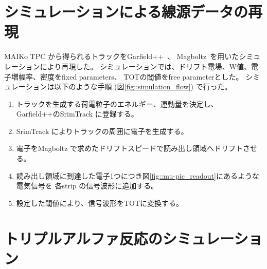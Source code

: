 \documentclass[../master]{subfiles}
\begin{document}
\section{シミュレーションによる線源データの再現}
MAIKo TPC から得られるトラックをGarfield++~\cite{garfield++}、
Magboltz~\cite{magboltz}を用いたシミュレーションにより再現した。
シミュレーションでは、ドリフト電場、W値、電子増幅率、密度をfixed parameters、
TOTの閾値をfree parameterとした。
シミュレーションは以下のような手順 (図\ref{fig::simulation_flow}) で行った。
\begin{enumerate}
\item\label{sim::particle_generate}
  トラックを生成する荷電粒子のエネルギー、運動量を決定し、
  Garfield++のSrimTrack に登録する。
\item
  SrimTrack によりトラックの周囲に電子を生成する。
\item
  電子をMagboltz で求めたドリフトスピードで読み出し領域へドリフトさせる。
\item
  読み出し領域に到達した電子1つにつき図\ref{fig::mu-pic_readout}にあるような電気信号を
  各strip の信号波形に追加する。
\item
  設定した閾値により、信号波形をTOTに変換する。
\end{enumerate}

\section{トリプルアルファ反応のシミュレーション}
\end{document}
